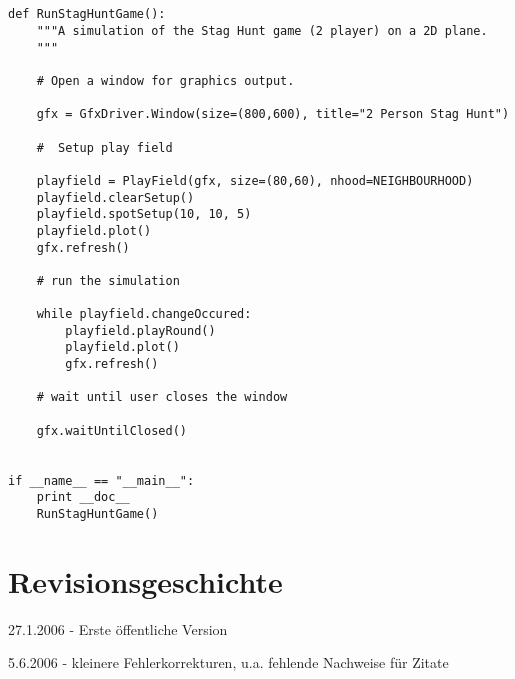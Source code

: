 \documentclass[12pt,a4paper,ngerman]{article}
\begin{document}
\begin{scriptsize}
\begin{verbatim}
        
    
def RunStagHuntGame():
    """A simulation of the Stag Hunt game (2 player) on a 2D plane.
    """
    
    # Open a window for graphics output.
    
    gfx = GfxDriver.Window(size=(800,600), title="2 Person Stag Hunt")   
    
    #  Setup play field

    playfield = PlayField(gfx, size=(80,60), nhood=NEIGHBOURHOOD)
    playfield.clearSetup()
    playfield.spotSetup(10, 10, 5)
    playfield.plot()
    gfx.refresh()

    # run the simulation

    while playfield.changeOccured:
        playfield.playRound()
        playfield.plot()
        gfx.refresh()

    # wait until user closes the window

    gfx.waitUntilClosed()
    

if __name__ == "__main__":
    print __doc__
    RunStagHuntGame()

\end{verbatim}
\end{scriptsize}

\newpage

\section{Revisionsgeschichte}

27.1.2006 - Erste öffentliche Version

5.6.2006 - kleinere Fehlerkorrekturen, u.a. fehlende Nachweise für Zitate




\end{document}
